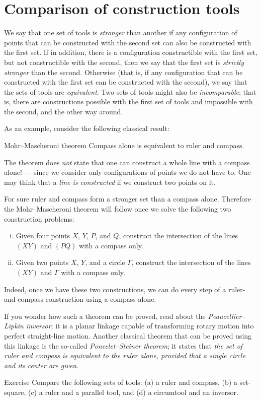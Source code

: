 \section{Comparison of construction tools}

We say that one set of tools is {}\emph{stronger} than another if any configuration of points that can be constructed with the second set can also be constructed with the first set.
If in addition, there is a configuration constructible with the first set, but not constructible with the second, then we say that the first set is {}\emph{strictly stronger} than the second.
Otherwise (that is, if any configuration that can be constructed with the first set can be constructed with the second), we say that the sets of tools are {}\emph{equivalent}. 
Two sets of tools might also be {}\emph{incomparable};
that is, there are constructions possible with the first set of tools and impossible with the second, and the other way around.

As an example, consider the following classical result:

\begin{thm}{Mohr--Mascheroni theorem}
Compass alone is equivalent to ruler and compass.
\end{thm}

The theorem does \textit{not} state that one can construct a whole line with a compass alone!
--- since we consider only configurations of points we do not have to.
One may think that a \textit{line is constructed} if we construct two points on it.

For sure ruler and compass form a stronger set than a compass alone.
Therefore the Mohr--Mascheroni theorem will follow once we solve the following two construction problems:
\begin{enumerate}[(i)]
\item Given four points $X$, $Y$, $P$, and $Q$, construct the intersection of the lines $(XY)$ and $(PQ)$ with  a compass only.
\item Given two points $X$, $Y$, and a circle $\Gamma$, construct the intersection of the lines $(XY)$ and $\Gamma$ with a compass only.
\end{enumerate}
Indeed, once we have these two constructions, we can do every step of a ruler-and-compass construction using a compass alone.

If you wonder how such a theorem can be proved, read about the \textit{Peaucellier--Lipkin inversor};
it is a planar linkage capable of transforming rotary motion into perfect straight-line motion.
Another classical theorem that can be proved using this linkage is the so-called \emph{Poncelet--Steiner theorem};
it states that \textit{the set of ruler and compass is equivalent to the ruler alone, provided that a single circle and its center are given}.

\begin{thm}{Exercise}\label{ex:comparison}
Compare the following sets of tools:
(a) a ruler and compass, 
(b) a set-square, 
(c) a ruler and a parallel tool,
and
(d) a circumtool and an inversor.
\end{thm}



